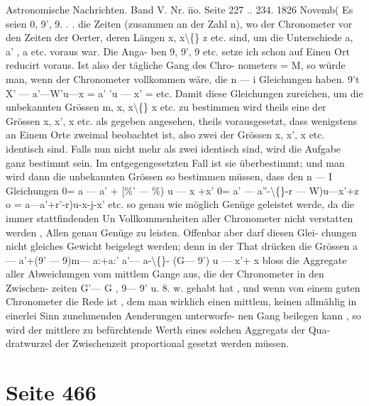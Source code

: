 \documentclass[10pt,a4paper]{article}
\begin{document}
Astronomische  Nachrichten.     Band  V.  Nr.  iio.  Seite  227 ..  234.     1826  Novemb(
Es  seien  0,  9',  9\glqq{}.  .  .  die  Zeiten  (zusammen  an  der  Zahl  n),  wo  der  Chronometer  vor  den  Zeiten
der  Oerter,  deren  Längen  x,  x\textbackslash\{\}  z\glqq{}  etc.  sind,  um  die  Unterschiede  a,  a' ,  a\glqq{}  etc.  voraus  war.  Die  Anga-
ben 9,  9',  9\glqq{}  etc.  setze  ich  schon  auf  Einen  Ort  reducirt  voraus.  Ist  also  der  tägliche  Gang  des  Chro-
nometers =  M,  so  würde  man,  wenn  der  Chronometer  vollkommen  wäre,  die  n  ---  i  Gleichungen  haben.
9't
X'  ---  a'---W'u---x\glqq{}  =  a'
'u  ---  x'\glqq{}  =  etc.
Damit  diese  Gleichungen  zureichen,  um  die  unbekannten  Grössen  m,  x,  x\textbackslash\{\}  x\glqq{}  etc.  zu  bestimmen
wird  theils  eine  der  Grössen  x,  x',  x\glqq{}  etc.  als  gegeben  angesehen,  theils  vorausgesetzt,  dass  wenigstens
an  Einem  Orte  zweimal  beobachtet  ist,  also  zwei  der  Grössen  x,  x',  x\glqq{}  etc.  identisch  sind.  Falls  nun
nicht  mehr  als  zwei  identisch  sind,  wird  die  Aufgabe  ganz  bestimmt  sein.  Im  entgegengesetzten  Fall
ist  sie  überbestimmt;  und  man  wird  dann  die  unbekannten  Grössen  so  bestimmen  müssen,  dass  den
n  ---  I   Gleichungen
0=  a  ---  a'  +  [\%'  ---  \%)  u  ---  x  +x'
0=  a'  ---  a''-\textbackslash\{\}-r  ---  W)u---x'+z\glqq{}
o  =  a\glqq{}---a\glqq{}'+r'-r)u-x\glqq{}-j-x\glqq{}'  etc.
so  genau  wie  möglich  Genüge  geleistet  werde,  da  die  immer  stattfindenden  Un Vollkommenheiten  aller
Chronometer  nicht  verstatten  werden ,  Allen  genau  Genüge  zu  leisten.  Offenbar  aber  darf  diesen  Glei-
chungen nicht  gleiches  Gewicht  beigelegt  werden;  denn  in  der  That  drücken  die  Grössen
a  --- a'+(9'  --- 9)m--- a:+a:'
a'---  a\glqq{}-\textbackslash\{\}-  (G\glqq{}---  9')  u  ---  x'+  x\glqq{}
bloss  die  Aggregate  aller  Abweichungen  vom  mittlem  Gange  aus,  die  der  Chronometer  in  den  Zwischen-
zeiten G'---  G ,  9\glqq{}---  9'  u.  8.  w.  gehabt  hat ,  und  wenn  von  einem  guten  Chronometer  die  Rede  ist ,  dem
man  wirklich  einen  mittlem,  keinen  allmählig  in  einerlei  Sinn  zunehmenden  Aenderungen  unterworfe-
nen Gang  beilegen  kann ,  so  wird  der  mittlere  zu  befürchtende  Werth  eines  solchen  Aggregats  der  Qua-
dratwurzel der  Zwischenzeit  proportional  gesetzt  werden  müssen.

\newpage
\section*{Seite 466}
\end{document}
